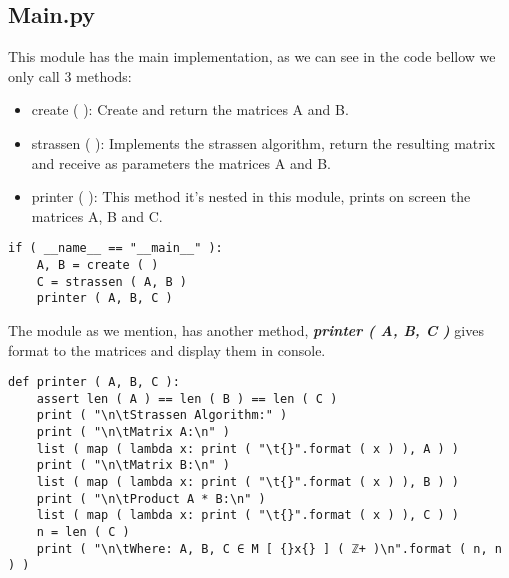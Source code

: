 \subsection{Main.py}

This module has the main implementation, as we can see in the code bellow we only call 3 methods:

\begin{itemize}
\item create ( ): Create and return the matrices A and B.
\item strassen ( ): Implements the strassen algorithm, return the resulting matrix and receive as parameters the matrices A and B.
\item printer ( ): This method it's nested in this module, prints on screen the matrices A, B and C.
\end{itemize}

\begin{lstlisting}
if ( __name__ == "__main__" ):
    A, B = create ( )
    C = strassen ( A, B )
    printer ( A, B, C )
\end{lstlisting} \hfill

The module as we mention, has another method, {\bfseries\itshape printer ( A, B, C )} gives format to the matrices and display them in console. \hfill \break

\begin{lstlisting}
def printer ( A, B, C ):
    assert len ( A ) == len ( B ) == len ( C )
    print ( "\n\tStrassen Algorithm:" )
    print ( "\n\tMatrix A:\n" )
    list ( map ( lambda x: print ( "\t{}".format ( x ) ), A ) )
    print ( "\n\tMatrix B:\n" )
    list ( map ( lambda x: print ( "\t{}".format ( x ) ), B ) )
    print ( "\n\tProduct A * B:\n" )
    list ( map ( lambda x: print ( "\t{}".format ( x ) ), C ) )
    n = len ( C )
    print ( "\n\tWhere: A, B, C ∈ M [ {}x{} ] ( ℤ+ )\n".format ( n, n ) )
\end{lstlisting} \hfill

{\bfseries\itshape\color{carmine}{Observation:}} {\itshape{}}

\pagebreak